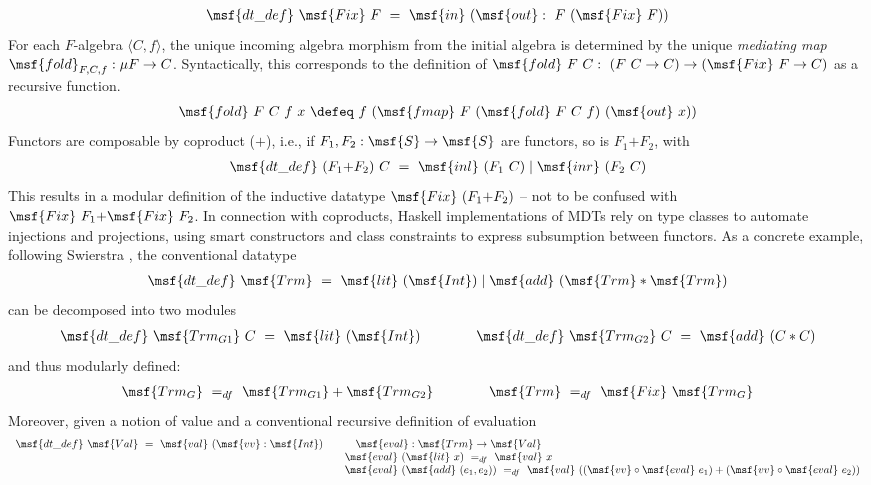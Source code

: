 \documentclass[submission,copyright,creativecommons]{eptcs}
\begin{document}
\begin{gather}
 \msf{dt\_def} \ \msf{Fix} \ F \ = \ \msf{in} \ (\msf{out} : \ F
 \ (\msf{Fix} \ F))
\end{gather}
For each $F$-algebra $\langle C, f \rangle$, the unique incoming
algebra morphism from the initial algebra is determined by the unique
\emph{mediating map} $ \msf{fold}_{F,C,f} : \mu F \to
C$. Syntactically, this corresponds to the definition of $\msf{fold}
\ F \ C : \ (F \ C \to C ) \to (\msf{Fix} \ F \to C)$ as a recursive
function.
\begin{gather}
 \msf{fold} \ F \ C \ f \ x \ \defeq \ f \ (\msf{fmap} \ F
 \ (\msf{fold} \ F \ C \ f) \ (\msf{out} \ x))
\end{gather}
Functors are composable by coproduct ($\mbox{+}$), i.e., if $F_1, F_2:
\msf{S} \to \msf{S}$ are functors, so is $F_1 \mbox{+} F_2$, with
\begin{gather}
 \msf{dt\_def} \ (F_1 \mbox{+} F_2) \ C \ = \ \msf{inl} \ (F_1 \ C)
 \mid \msf{inr} \ (F_2 \ C)
\end{gather}
This results in a modular definition of the inductive datatype
$\msf{Fix} \ (F_1 \mbox{+} F_2)$ -- not to be confused with $\msf{Fix}
\ F_1 \mbox{+} \msf{Fix} \ F_2$.  In connection with coproducts,
Haskell implementations of MDTs rely on type classes to automate
injections and projections, using smart constructors and class
constraints to express subsumption between functors.  As a concrete
example, following Swierstra \cite{Swier08}, the conventional datatype
\begin{gather} \label{data-rhoX1}
 \msf{dt\_def} \ \msf{Trm} \ = \ \msf{lit} \ (\msf{Int}) 
  \mid \msf{add} \ (\msf{Trm} * \msf{Trm})
\end{gather}
can be decomposed into two modules
\begin{gather} \label{data-rhoX2}
 \msf{dt\_def} \ \msf{Trm_{G1}} \ C \ = \ \msf{lit} \ (\msf{Int})
 \qquad \qquad
\msf{dt\_def} \ \msf{Trm_{G2}} \ C \ = \ \msf{add} \ (C * C)
\end{gather}
and thus modularly defined: 
\begin{gather} \label{data-rhoX3}
\msf{Trm_G} \ =_{df} \ \msf{Trm_{G1}} + \msf{Trm_{G2}} \qquad \qquad 
\msf{Trm} \ =_{df} \ \msf{Fix} \ \msf{Trm_G}
\end{gather}
Moreover, given a notion of value and a conventional recursive
definition of evaluation
\begin{gather} \label{data-rhoX5}
\begin{array}{lll}
 \msf{dt\_def} \ \msf{Val} \ = \ \msf{val} \ (\msf{vv}: \msf{Int})
&
\qquad \msf{eval} : \msf{Trm} \to \msf{Val} \\
& \quad \msf{eval} \ (\msf{lit} \ x) \ =_{df} \ \msf{val} \ x \\
& \quad \msf{eval} \ (\msf{add} \ (e_1,e_2)) \ =_{df} \ \msf{val}
\ ((\msf{vv} \circ \msf{eval} \ e_1) + (\msf{vv} \circ \msf{eval}
\ e_2))
\end{array}
\end{gather}
\end{document}
